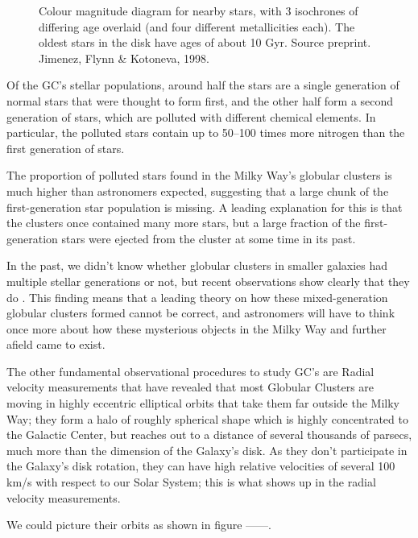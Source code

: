 \begin{figure}[H]
\begin{minipage}[b]{0.54\textwidth}
    \caption[HR Diagram for Stars]{Colour magnitude diagram for nearby stars, with 3 isochrones of differing age overlaid (and four different metallicities each). The oldest stars in the disk have ages of about 10 Gyr. Source preprint. Jimenez, Flynn \& Kotoneva, 1998.}
  \end{minipage}
\end{figure}
 
Of the GC's stellar populations, around half the stars are a single generation of normal stars that were thought to form first, and the other half form a second generation of stars, which are polluted with different chemical elements. In particular, the polluted stars contain up to 50–100 times more nitrogen than the first generation of stars.

The proportion of polluted stars found in the Milky Way's globular clusters is much higher than astronomers expected, suggesting that a large chunk of the first-generation star population is missing. A leading explanation for this is that the clusters once contained many more stars, but a large fraction of the first-generation stars were ejected from the cluster at some time in its past.

In the past, we didn't know whether globular clusters in smaller galaxies had multiple stellar generations or not, but recent observations show clearly that they do \cite{15}. This finding means that a leading theory on how these mixed-generation globular clusters formed cannot be correct, and astronomers will have to think once more about how these mysterious objects in the Milky Way and further afield came to exist.

The other fundamental observational procedures to study GC's are Radial velocity measurements that have revealed that most Globular Clusters are moving in highly eccentric elliptical orbits that take them far outside the Milky Way; they form a halo of roughly spherical shape which is highly concentrated to the Galactic Center, but reaches out to a distance of several thousands of parsecs, much more than the dimension of the Galaxy's disk. As they don't participate in the Galaxy's disk rotation, they can have high relative velocities of several 100 km/s with respect to our Solar System; this is what shows up in the radial velocity measurements. 

We could picture their orbits as shown in figure ------.

